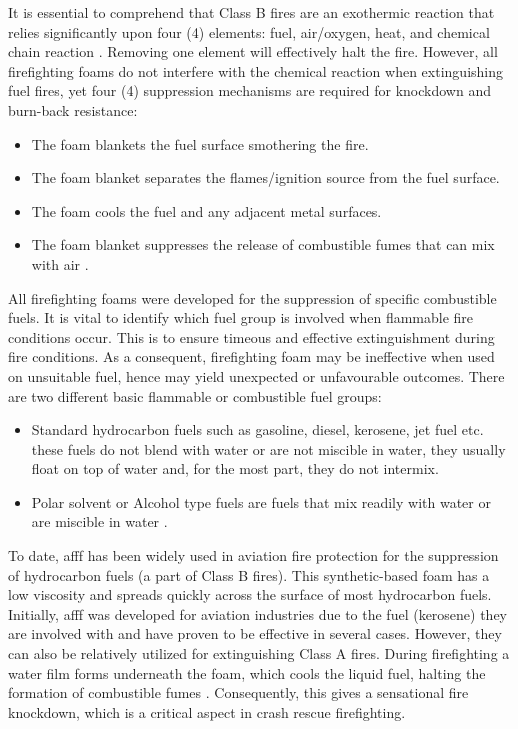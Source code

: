 It is essential to comprehend that Class B fires are an exothermic reaction that relies significantly upon four (4) elements: fuel, air/oxygen, heat, and chemical chain reaction \cite{beneventi2001role}. Removing one element will effectively halt the fire.  However, all firefighting foams do not interfere with the chemical reaction when extinguishing fuel fires, yet four (4) suppression mechanisms are required for knockdown and burn-back resistance: 

\begin{itemize}
    \item The foam blankets the fuel surface smothering the fire. 
    \item The foam blanket separates the flames/ignition source from the fuel surface. 
    \item The foam cools the fuel and any adjacent metal surfaces. 
    \item The foam blanket suppresses the release of combustible fumes that can mix with air \cite{beneventi2001role}. 
\end{itemize}

All firefighting foams were developed for the suppression of specific combustible fuels. It is vital to identify which fuel group is involved when flammable fire conditions occur. This is to ensure timeous and effective extinguishment during fire conditions. As a consequent, firefighting foam may be ineffective when used on unsuitable fuel, hence may yield unexpected or unfavourable outcomes. There are two different basic flammable or combustible fuel groups:

\begin{itemize}
    \item Standard hydrocarbon fuels such as gasoline, diesel, kerosene, jet fuel etc. these fuels do not blend with water or are not miscible in water, they usually float on top of water and, for the most part, they do not intermix.
    \item Polar solvent or Alcohol type fuels are fuels that mix readily with water or are miscible in water \cite{beneventi2001role}.
\end{itemize}

To date, \acrshort{afff} has been widely used in aviation fire protection for the suppression of hydrocarbon fuels (a part of Class B fires). This synthetic-based foam has a low viscosity and spreads quickly across the surface of most hydrocarbon fuels. Initially, \acrshort{afff} was developed for aviation industries due to the fuel (kerosene) they are involved with and have proven to be effective in several cases. However, they can also be relatively utilized for extinguishing Class A fires. During firefighting a water film forms underneath the foam, which cools the liquid fuel, halting the formation of combustible fumes \cite{scheffey1995evaluating}. Consequently, this gives a sensational fire knockdown, which is a critical aspect in crash rescue firefighting.

